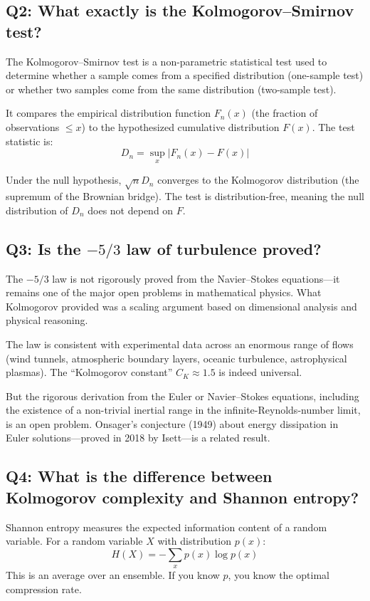\subsection*{Q2: What exactly is the Kolmogorov--Smirnov test?}

The Kolmogorov--Smirnov test is a non-parametric statistical test used to determine whether a sample comes from a specified distribution (one-sample test) or whether two samples come from the same distribution (two-sample test).

It compares the empirical distribution function $F_n(x)$ (the fraction of observations $\leq x$) to the hypothesized cumulative distribution $F(x)$. The test statistic is:
\[
D_n = \sup_{x} |F_n(x) - F(x)|
\]

Under the null hypothesis, $\sqrt{n} D_n$ converges to the Kolmogorov distribution (the supremum of the Brownian bridge). The test is distribution-free, meaning the null distribution of $D_n$ does not depend on $F$.

\subsection*{Q3: Is the $-5/3$ law of turbulence proved?}

The $-5/3$ law is not rigorously proved from the Navier--Stokes equations---it remains one of the major open problems in mathematical physics. What Kolmogorov provided was a scaling argument based on dimensional analysis and physical reasoning.

The law is consistent with experimental data across an enormous range of flows (wind tunnels, atmospheric boundary layers, oceanic turbulence, astrophysical plasmas). The ``Kolmogorov constant'' $C_K \approx 1.5$ is indeed universal.

But the rigorous derivation from the Euler or Navier--Stokes equations, including the existence of a non-trivial inertial range in the infinite-Reynolds-number limit, is an open problem. Onsager's conjecture (1949) about energy dissipation in Euler solutions---proved in 2018 by Isett---is a related result.

\subsection*{Q4: What is the difference between Kolmogorov complexity and Shannon entropy?}

Shannon entropy measures the expected information content of a random variable. For a random variable $X$ with distribution $p(x)$:
\[
H(X) = -\sum_x p(x) \log p(x)
\]
This is an average over an ensemble. If you know $p$, you know the optimal compression rate.

